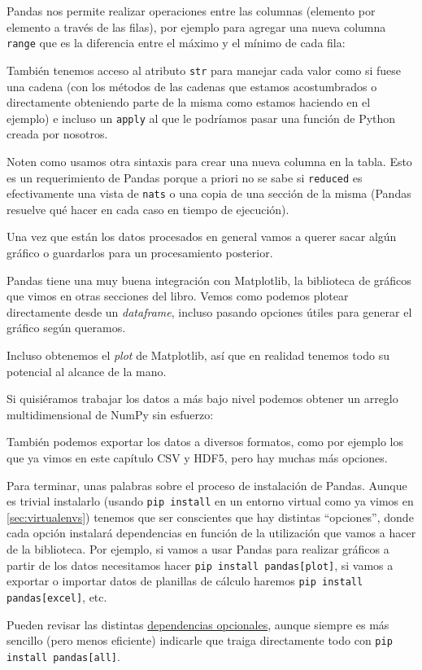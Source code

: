 Pandas nos permite realizar operaciones entre las columnas (elemento por elemento a través de las filas), por ejemplo para agregar una nueva columna \texttt{range} que es la diferencia entre el máximo y el mínimo de cada fila:


También tenemos acceso al atributo \texttt{str} para manejar cada valor como si fuese una cadena (con los métodos de las cadenas que estamos acostumbrados o directamente obteniendo parte de la misma como estamos haciendo en el ejemplo) e incluso un \texttt{apply} al que le podríamos pasar una función de Python creada por nosotros.

Noten como usamos otra sintaxis para crear una nueva columna en la tabla. Esto es un requerimiento de Pandas porque a priori no se sabe si \texttt{reduced} es efectivamente una vista de \texttt{nats} o una copia de una sección de la misma (Pandas resuelve qué hacer en cada caso en tiempo de ejecución).

Una vez que están los datos procesados en general vamos a querer sacar algún gráfico o guardarlos para un procesamiento posterior.

Pandas tiene una muy buena integración con Matplotlib, la biblioteca de gráficos que vimos en otras secciones del libro. Vemos como podemos plotear directamente desde un \textit{dataframe}, incluso pasando opciones útiles para generar el gráfico según queramos.


Incluso obtenemos el \textit{plot} de Matplotlib, así que en realidad tenemos todo su potencial al alcance de la mano.


Si quisiéramos trabajar los datos a más bajo nivel podemos obtener un arreglo multidimensional de NumPy sin esfuerzo:


También podemos exportar los datos a diversos formatos, como por ejemplo los que ya vimos en este capítulo CSV y HDF5, pero hay muchas más opciones.


Para terminar, unas palabras sobre el proceso de instalación de Pandas. Aunque es trivial instalarlo (usando \texttt{pip install} en un entorno virtual como ya vimos en \ref{sec:virtualenvs}) tenemos que ser conscientes que hay distintas ``opciones'', donde cada opción instalará dependencias en función de la utilización que vamos a hacer de la biblioteca. Por ejemplo, si vamos a usar Pandas para realizar gráficos a partir de los datos necesitamos hacer \texttt{pip install pandas[plot]}, si vamos a exportar o importar datos de planillas de cálculo haremos \texttt{pip install pandas[excel]}, etc.

Pueden revisar las distintas \href{https://pandas.pydata.org/docs/getting_started/install.html#optional-dependencies}{dependencias opcionales}, aunque siempre es más sencillo (pero menos eficiente) indicarle que traiga directamente todo con \texttt{pip install pandas[all]}.
